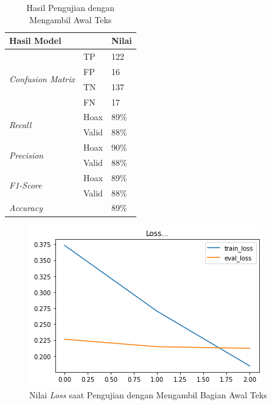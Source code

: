 \begin{table}
    \caption{Hasil Pengujian dengan Mengambil Awal Teks}
    \label{tab: const_awal}
    \centering
    \begin{tabular}{|l|l|l|}
        \hline
        \multicolumn{2}{|l|}{\textbf{Hasil Model}} & \textbf{Nilai}        \\ \hline
        \multirow{4}{*}{\textit{Confusion Matrix}} & TP             & 122  \\ \cline{2-3}
                                                   & FP             & 16   \\ \cline{2-3}
                                                   & TN             & 137  \\ \cline{2-3}
                                                   & FN             & 17   \\ \hline
        \multirow{2}{*}{\textit{Recall}}           & Hoax           & 89\% \\ \cline{2-3}
                                                   & Valid          & 88\% \\ \hline
        \multirow{2}{*}{\textit{Precision}}        & Hoax           & 90\% \\ \cline{2-3}
                                                   & Valid          & 88\% \\ \hline
        \multirow{2}{*}{\textit{F1-Score}}         & Hoax           & 89\% \\ \cline{2-3}
                                                   & Valid          & 88\% \\ \hline
        \multicolumn{2}{|l|}{\textit{Accuracy}}    & 89\%                  \\ \hline
    \end{tabular}
\end{table}

\begin{figure}[h]
    \begin{center}
        \includegraphics[width= 0.9\linewidth]{gambar/loss_concat_awal.png}
        \caption{Nilai \textit{Loss} saat Pengujian dengan Mengambil Bagian Awal Teks}
        \label{fig: loss_const_awal}
    \end{center}
\end{figure}


